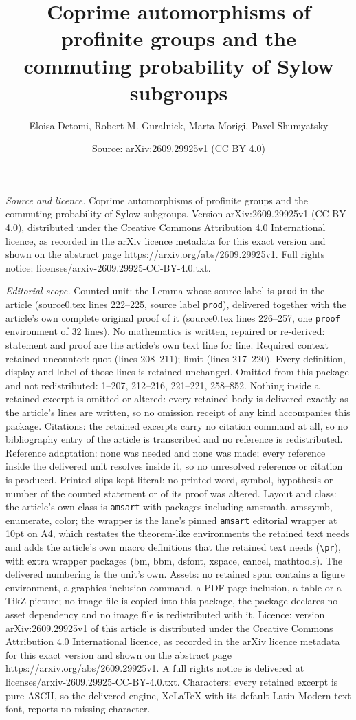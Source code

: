 \documentclass[10pt,a4paper]{amsart}
\title[Coprime automorphisms of profinite groups and the commuting ]{Coprime automorphisms of profinite groups and the commuting probability of Sylow subgroups}
\author{Eloisa Detomi, Robert M. Guralnick, Marta Morigi, Pavel Shumyatsky}
\date{Source: arXiv:2609.29925v1 (CC BY 4.0)}
\begin{document}
\maketitle

\noindent\emph{Source and licence.} Coprime automorphisms of profinite groups and the commuting probability of Sylow subgroups. Version arXiv:2609.29925v1 (CC BY 4.0), distributed under the Creative Commons Attribution 4.0 International licence, as recorded in the arXiv licence metadata for this exact version and shown on the abstract page https://arxiv.org/abs/2609.29925v1. Full rights notice: licenses/arxiv-2609.29925-CC-BY-4.0.txt.\par\smallskip

\noindent\textit{Editorial scope.} Counted unit: the Lemma whose source label is \texttt{prod} in the article (source0.tex lines 222--225, source label \texttt{prod}), delivered together with the article's own complete original proof of it (source0.tex lines 226--257, one \texttt{proof} environment of 32 lines). No mathematics is written, repaired or re-derived: statement and proof are the article's own text line for line. Required context retained uncounted: quot (lines 208--211); limit (lines 217--220). Every definition, display and label of those lines is retained unchanged. Omitted from this package and not redistributed: 1--207, 212--216, 221--221, 258--852. Nothing inside a retained excerpt is omitted or altered: every retained body is delivered exactly as the article's lines are written, so no omission receipt of any kind accompanies this package. Citations: the retained excerpts carry no citation command at all, so no bibliography entry of the article is transcribed and no reference is redistributed. Reference adaptation: none was needed and none was made; every reference inside the delivered unit resolves inside it, so no unresolved reference or citation is produced. Printed slips kept literal: no printed word, symbol, hypothesis or number of the counted statement or of its proof was altered. Layout and class: the article's own class is \texttt{amsart} with packages including amsmath, amssymb, enumerate, color; the wrapper is the lane's pinned \texttt{amsart} editorial wrapper at 10pt on A4, which restates the theorem-like environments the retained text needs and adds the article's own macro definitions that the retained text needs (\texttt{\textbackslash pr}), with extra wrapper packages (bm, bbm, dsfont, xspace, cancel, mathtools). The delivered numbering is the unit's own. Assets: no retained span contains a figure environment, a graphics-inclusion command, a PDF-page inclusion, a table or a TikZ picture; no image file is copied into this package, the package declares no asset dependency and no image file is redistributed with it. Licence: version arXiv:2609.29925v1 of this article is distributed under the Creative Commons Attribution 4.0 International licence, as recorded in the arXiv licence metadata for this exact version and shown on the abstract page https://arxiv.org/abs/2609.29925v1. A full rights notice is delivered at licenses/arxiv-2609.29925-CC-BY-4.0.txt. Characters: every retained excerpt is pure ASCII, so the delivered engine, XeLaTeX with its default Latin Modern text font, reports no missing character.
\end{document}
